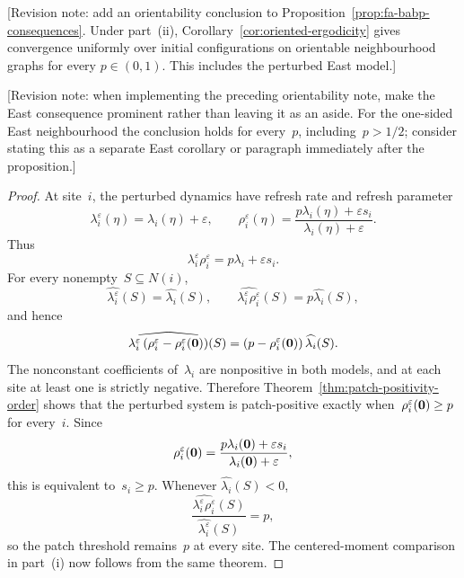 \textcolor{revisionpurple}{[Revision note: add an orientability conclusion to
Proposition~\ref{prop:fa-babp-consequences}. Under part~\textup{(ii)},
Corollary~\ref{cor:oriented-ergodicity} gives convergence uniformly over
initial configurations on orientable neighbourhood graphs for every
$p\in(0,1)$. This includes the perturbed East model.]}

\textcolor{revisionpurple}{[Revision note: when implementing the preceding orientability note, make the East consequence prominent rather than leaving it as an aside. For the one-sided East neighbourhood the conclusion holds for every~$p$, including~$p>1/2$; consider stating this as a separate East corollary or paragraph immediately after the proposition.]}

\begin{proof}
At site~$i$, the perturbed dynamics have refresh rate and refresh parameter
\begin{equation*}
\lambda_i^\varepsilon(\eta)=\lambda_i(\eta)+\varepsilon,
\qquad
\rho_i^\varepsilon(\eta)
=
\frac{p\lambda_i(\eta)+\varepsilon s_i}
{\lambda_i(\eta)+\varepsilon}.
\end{equation*}
Thus
\begin{equation*}
\lambda_i^\varepsilon\rho_i^\varepsilon
=
p\lambda_i+\varepsilon s_i.
\end{equation*}
For every nonempty~$S\subseteq N(i)$,
\begin{equation*}
\widehat{\lambda_i^\varepsilon}(S)=\widehat{\lambda_i}(S),
\qquad
\widehat{\lambda_i^\varepsilon\rho_i^\varepsilon}(S)
=
p\widehat{\lambda_i}(S),
\end{equation*}
and hence
\begin{equation*}
\widehat{\lambda_i^\varepsilon
\left(\rho_i^\varepsilon-\rho_i^\varepsilon(\mathbf{0})\right)}(S)
=
\left(p-\rho_i^\varepsilon(\mathbf{0})\right)\widehat{\lambda_i}(S).
\end{equation*}
The nonconstant coefficients of~$\lambda_i$ are nonpositive in both models,
and at each site at least one is strictly negative. Therefore
Theorem~\ref{thm:patch-positivity-order} shows that the perturbed system is
patch-positive exactly when~$\rho_i^\varepsilon(\mathbf{0})\geq p$ for every~$i$.
Since
\begin{equation*}
\rho_i^\varepsilon(\mathbf{0})
=
\frac{p\lambda_i(\mathbf{0})+\varepsilon s_i}
{\lambda_i(\mathbf{0})+\varepsilon},
\end{equation*}
this is equivalent to~$s_i\geq p$. Whenever
$\widehat{\lambda_i}(S)<0$,
\begin{equation*}
\frac{\widehat{\lambda_i^\varepsilon\rho_i^\varepsilon}(S)}
{\widehat{\lambda_i^\varepsilon}(S)}
=p,
\end{equation*}
so the patch threshold remains~$p$ at every site. The centered-moment
comparison in part~\textup{(i)} now follows from the same theorem.


\end{proof}
